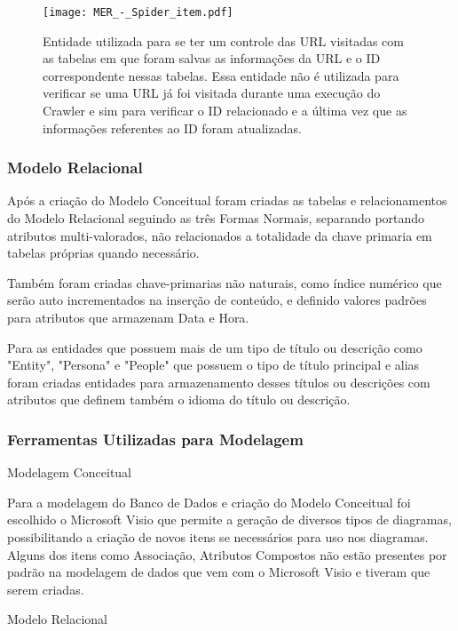 \documentclass[12pt]{article}
\begin{document}
\begin{figure}[H]
\centering
\texttt{[image: MER\_-\_Spider\_item.pdf]}
\caption{Entidade utilizada para se ter um controle das URL visitadas com as tabelas em que foram salvas as informações da URL e o ID correspondente nessas tabelas. Essa entidade não é utilizada para verificar se uma URL já foi visitada durante uma execução do Crawler e sim para verificar o ID relacionado e a última vez que as informações referentes ao ID foram atualizadas.} \label{hash}
\end{figure}

\subsubsection{Modelo Relacional}

Após a criação do Modelo Conceitual foram criadas as tabelas e relacionamentos do Modelo Relacional seguindo as três Formas Normais, separando portando atributos multi-valorados, não relacionados a totalidade da chave primaria em tabelas próprias quando necessário.

Também foram criadas chave-primarias não naturais, como índice numérico que serão auto incrementados na inserção de conteúdo, e definido valores padrões para atributos que armazenam Data e Hora.

Para as entidades que possuem mais de um tipo de título ou descrição como "Entity", "Persona" e "People" que possuem o tipo de título principal e alias foram criadas entidades para armazenamento desses títulos ou descrições com atributos que definem também o idioma do título ou descrição.


\subsubsection{Ferramentas Utilizadas para Modelagem}

Modelagem Conceitual

Para a modelagem do Banco de Dados e criação do Modelo Conceitual foi escolhido o Microsoft Visio que permite a geração de diversos tipos de diagramas, possibilitando a criação de novos itens se necessários para uso nos diagramas. Alguns dos itens como Associação, Atributos Compostos não estão presentes por padrão na modelagem de dados que vem com o Microsoft Visio e tiveram que serem criadas.

Modelo Relacional
\end{document}
